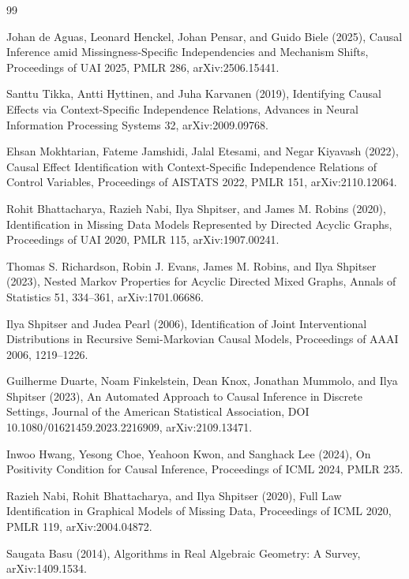 \documentclass{article}
\begin{document}
\begin{thebibliography}{99}

   Johan de Aguas, Leonard Henckel, Johan Pensar, and Guido Biele (2025), Causal Inference amid Missingness-Specific Independencies and Mechanism Shifts, Proceedings of UAI 2025, PMLR 286, arXiv:2506.15441.

   Santtu Tikka, Antti Hyttinen, and Juha Karvanen (2019), Identifying Causal Effects via Context-Specific Independence Relations, Advances in Neural Information Processing Systems 32, arXiv:2009.09768.

   Ehsan Mokhtarian, Fateme Jamshidi, Jalal Etesami, and Negar Kiyavash (2022), Causal Effect Identification with Context-Specific Independence Relations of Control Variables, Proceedings of AISTATS 2022, PMLR 151, arXiv:2110.12064.

   Rohit Bhattacharya, Razieh Nabi, Ilya Shpitser, and James M. Robins (2020), Identification in Missing Data Models Represented by Directed Acyclic Graphs, Proceedings of UAI 2020, PMLR 115, arXiv:1907.00241.

   Thomas S. Richardson, Robin J. Evans, James M. Robins, and Ilya Shpitser (2023), Nested Markov Properties for Acyclic Directed Mixed Graphs, Annals of Statistics 51, 334--361, arXiv:1701.06686.

   Ilya Shpitser and Judea Pearl (2006), Identification of Joint Interventional Distributions in Recursive Semi-Markovian Causal Models, Proceedings of AAAI 2006, 1219--1226.

   Guilherme Duarte, Noam Finkelstein, Dean Knox, Jonathan Mummolo, and Ilya Shpitser (2023), An Automated Approach to Causal Inference in Discrete Settings, Journal of the American Statistical Association, DOI 10.1080/01621459.2023.2216909, arXiv:2109.13471.

   Inwoo Hwang, Yesong Choe, Yeahoon Kwon, and Sanghack Lee (2024), On Positivity Condition for Causal Inference, Proceedings of ICML 2024, PMLR 235.

   Razieh Nabi, Rohit Bhattacharya, and Ilya Shpitser (2020), Full Law Identification in Graphical Models of Missing Data, Proceedings of ICML 2020, PMLR 119, arXiv:2004.04872.

   Saugata Basu (2014), Algorithms in Real Algebraic Geometry: A Survey, arXiv:1409.1534.

\end{thebibliography}
\end{document}
